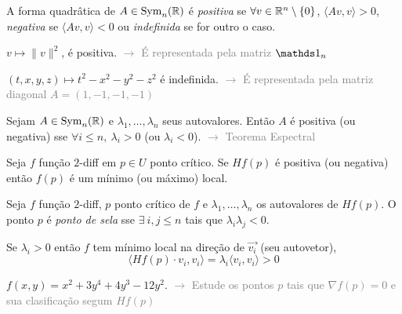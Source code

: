 \begin{definition}
    A forma quadrâtica de \(A \in \operatorname{Sym}_n(\mathbb{R})\) é \emph{positiva} se \(\forall v\in \mathbb{R}^n \setminus \{0\}\), \(\langle Av, v\rangle > 0\), \emph{negativa} se \(\langle Av, v\rangle<0\) ou \emph{indefinida} se for outro o caso. 
\end{definition}

\Ei

\begin{example}
    \(v\mapsto \|v\|^2\), é positiva. \textcolor{gray}{\( \rightarrow \) É representada pela matriz \(\id_n\)}   
\end{example}
\begin{example}
    \((t,x,y,z) \mapsto t^2-x^2-y^2-z^2\) é indefinida. \textcolor{gray}{\(\rightarrow\) É representada pela matriz diagonal \(A = (1,-1,-1,-1)\)}
\end{example}
\Ef


\begin{lemma}
    Sejam \(A\in \operatorname{Sym}_{n}(\mathbb{R})\) e \(\lambda_1, \ldots, \lambda_n\) seus autovalores. Então \(A\) é positiva (ou negativa) sse \( \forall i\leq n, \ \lambda_i>0 \) (ou \(\lambda_i <0\)). \textcolor{gray}{\(\rightarrow \) Teorema Espectral}
\end{lemma}

\begin{theorem}
    Seja \(f\) função \(2\)-diff em \(p\in U\) ponto crítico. Se \(Hf(p)\) é positiva (ou negativa) então \(f(p)\) é um mínimo (ou máximo) local. 
\end{theorem}

\begin{definition}
    Seja \(f\) função \(2\)-diff, \(p\) ponto crítico de \(f\) e \(\lambda_1, \ldots, \lambda_n\) os autovalores de \(Hf(p)\). O ponto \(p\) é \emph{ponto de sela} sse \(\exists \ i,j\leq n\) tais que \(\lambda_i\lambda_j <0\). 
\end{definition}
\begin{note}
    Se \(\lambda_i > 0 \) então \(f\) tem mínimo local na direção de \(\vec{v_i}\) (seu autovetor), 
    \[\langle Hf(p)\cdot v_i, v_i\rangle = \lambda_i \langle v_i, v_i\rangle > 0\]   
\end{note}
\begin{example}
    \(f(x,y) = x^2 + 3y^4+ 4y^3 - 12y^2\). \textcolor{gray}{\(\rightarrow\) Estude os pontos \(p\) tais que \(\nabla f(p)=0\) e sua clasificação segum \(Hf(p)\) }
\end{example}

